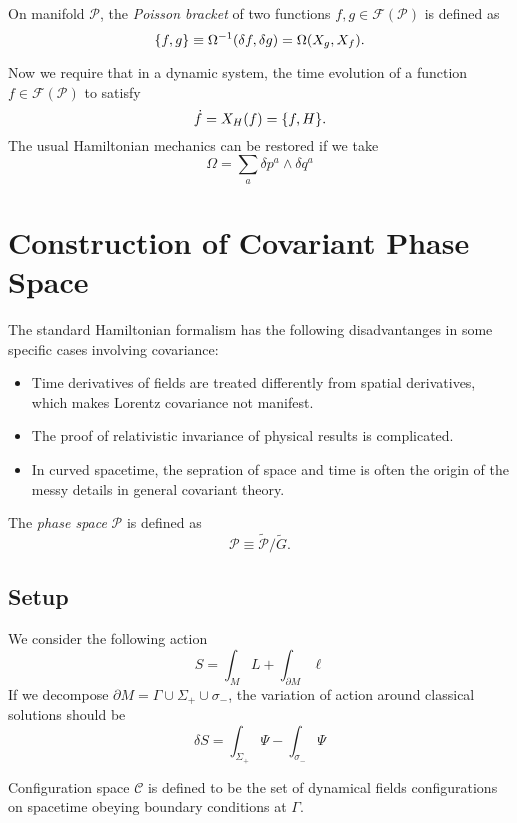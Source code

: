 \documentclass[10pt]{article}
\begin{document}
\begin{definition}
    On manifold $\mathcal{P}$, the \textit{Poisson bracket} of two functions  $f,g\in\mathcal{F}(\mathcal{P})$ is defined as
    \begin{equation}
        \pb{f}{g}\equiv\Omega^{-1}(\delta f,\delta g)=\Omega(X_g,X_f).
    \end{equation}
\end{definition}
Now we require that in a dynamic system, the time evolution of a function $f\in\mathcal{F}(\mathcal{P})$ to satisfy
\begin{equation}
    \dot{f}=X_H(f)=\pb{f}{H}.
\end{equation}
The usual Hamiltonian mechanics can be restored if we take
\begin{equation}
    \Omega=\sum_a \delta p^a\wedge \delta q^a
\end{equation}

\section{Construction of Covariant Phase Space}
The standard Hamiltonian formalism has the following disadvantanges in some specific cases involving covariance\cite{Gieres:2021ekc}:
\begin{itemize}
    \item Time derivatives of fields are treated differently from spatial derivatives, which makes Lorentz covariance not manifest.
    \item The proof of relativistic invariance of physical results is complicated.
    \item In curved spacetime, the sepration of space and time is often the origin of the messy details in general covariant theory.
\end{itemize}
\begin{definition}
    The \textit{phase space} $\mathcal{P}$ is defined as
    \begin{equation}
        \mathcal{P}\equiv\tilde{\mathcal{P}}/\tilde{G}.
    \end{equation}
\end{definition}
\subsection{Setup}
We consider the following action
\begin{equation}
    S=\int_M L+\int_{\partial M}\ell\label{eq:action}
\end{equation}
If we decompose $\partial M=\Gamma\cup\Sigma_+\cup\sigma_-$, the variation of action around classical solutions should be
\begin{equation}
    \delta S=\int_{\Sigma_+}\Psi-\int_{\sigma_-}\Psi\label{var_S_1}
\end{equation}
\begin{definition}
    Configuration space $\mathcal{C}$ is defined to be the set of dynamical fields configurations on spacetime obeying boundary conditions at $\Gamma$.
\end{definition}
\end{document}
